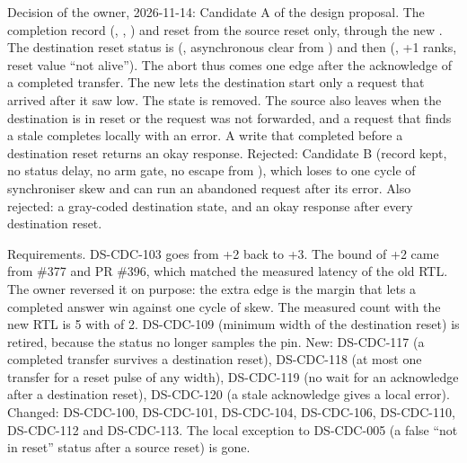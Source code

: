 \begin{record}

Decision of the owner, 2026-11-14: Candidate A of the design proposal. The completion record (, , ) and  reset from the source reset only, through the new . The destination reset status is  (, asynchronous clear from ) and then  (, +1 ranks, reset value ``not alive''). The abort thus comes one edge after the acknowledge of a completed transfer. The new  lets the destination start only a request that arrived after it saw  low. The state  is removed. The source also leaves  when the destination is in reset or the request was not forwarded, and a request that finds a stale  completes locally with an error. A write that completed before a destination reset returns an okay response. Rejected: Candidate B (record kept, no status delay, no arm gate, no escape from ), which loses to one cycle of synchroniser skew and can run an abandoned request after its error. Also rejected: a gray-coded destination state, and an okay response after every destination reset.

\end{record}

\begin{record}

Requirements. DS-CDC-103 goes from +2 back to +3. The bound of +2 came from \#377 and PR \#396, which matched the measured latency of the old RTL. The owner reversed it on purpose: the extra edge is the margin that lets a completed answer win against one cycle of skew. The measured count with the new RTL is 5 with  of 2. DS-CDC-109 (minimum width of the destination reset) is retired, because the status no longer samples the pin. New: DS-CDC-117 (a completed transfer survives a destination reset), DS-CDC-118 (at most one transfer for a reset pulse of any width), DS-CDC-119 (no wait for an acknowledge after a destination reset), DS-CDC-120 (a stale acknowledge gives a local error). Changed: DS-CDC-100, DS-CDC-101, DS-CDC-104, DS-CDC-106, DS-CDC-110, DS-CDC-112 and DS-CDC-113. The local exception to DS-CDC-005 (a false ``not in reset'' status after a source reset) is gone.

\end{record}

